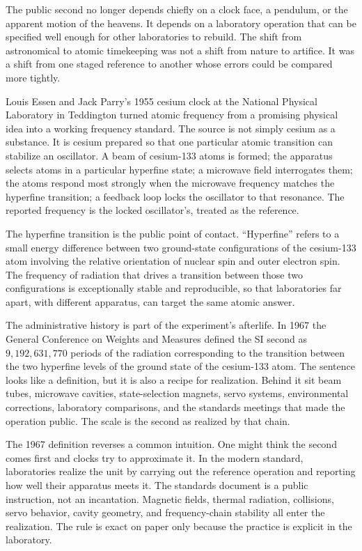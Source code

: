 The public second no longer depends chiefly on a clock face, a pendulum, or
the apparent motion of the heavens. It depends on a laboratory operation
that can be specified well enough for other laboratories to rebuild. The
shift from astronomical to atomic timekeeping was not a shift from nature
to artifice. It was a shift from one staged reference to another whose
errors could be compared more tightly.

Louis Essen and Jack Parry's 1955 cesium clock at the National Physical
Laboratory in Teddington turned atomic frequency from a promising physical
idea into a working frequency standard. The source is not simply cesium as
a substance. It is cesium prepared so that one particular atomic transition
can stabilize an oscillator. A beam of cesium-133 atoms is formed; the
apparatus selects atoms in a particular hyperfine state; a microwave field
interrogates them; the atoms respond most strongly when the microwave
frequency matches the hyperfine transition; a feedback loop locks the
oscillator to that resonance. The reported frequency is the locked
oscillator's, treated as the reference.

The hyperfine transition is the public point of contact. ``Hyperfine''
refers to a small energy difference between two ground-state configurations
of the cesium-133 atom involving the relative orientation of nuclear spin
and outer electron spin. The frequency of radiation that drives a
transition between those two configurations is exceptionally stable and
reproducible, so that laboratories far apart, with different apparatus,
can target the same atomic answer.

The administrative history is part of the experiment's afterlife. In 1967
the General Conference on Weights and Measures defined the SI second as
\(9{,}192{,}631{,}770\) periods of the radiation corresponding to the
transition between the two hyperfine levels of the ground state of the
cesium-133 atom. The sentence looks like a definition, but it is also a
recipe for realization. Behind it sit beam tubes, microwave cavities,
state-selection magnets, servo systems, environmental corrections,
laboratory comparisons, and the standards meetings that made the operation
public. The scale is the second as realized by that chain.

The 1967 definition reverses a common intuition. One might think the second
comes first and clocks try to approximate it. In the modern standard,
laboratories realize the unit by carrying out the reference operation and
reporting how well their apparatus meets it. The standards document is a
public instruction, not an incantation. Magnetic fields, thermal radiation,
collisions, servo behavior, cavity geometry, and frequency-chain stability
all enter the realization. The rule is exact on paper only because the
practice is explicit in the laboratory.

